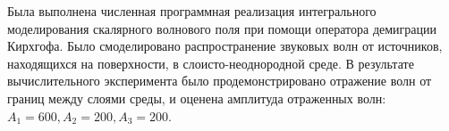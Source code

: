 \documentclass[a4paper, fontsize=14pt]{article}
\begin{document}
Была выполнена численная программная реализация интегрального моделирования скалярного волнового
поля при помощи оператора демиграции Кирхгофа. Было смоделировано распространение звуковых волн от
источников, находящихся на поверхности, в слоисто-неоднородной среде. В результате вычислительного 
эксперимента было продемонстрировано отражение волн от границ между слоями среды, и оценена
амплитуда отраженных волн: $A_1 = 600, A_2 = 200, A_3 = 200$.

\newpage


\printbibliography

\newpage


\end{document}
